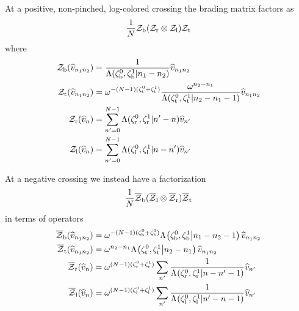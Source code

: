 \documentclass{sl2ams}
\numberwithin{equation}{section}
\begin{document}
\begin{theorem}
  \label{thm:R-factorization}
  At a positive, non-pinched, log-colored crossing the brading matrix factors as
  \begin{equation}
    \label{eq:R-factorization-positive}
    \frac{
      1
    }{
      N
    }
    \mathcal{Z}_{\mathrm{b}} (\mathcal{Z}_{\mathrm{r}} \otimes \mathcal{Z}_{\mathrm{l}}) \mathcal{Z}_{\mathrm{t}}
  \end{equation}
  where
  \begin{align*}
    \mathcal{Z}_{\mathrm{b}}(\widehat{v}_{n_1 n_2})
    &=
    \frac{
      1
    }{
      \Lambda({\zeta^0_{\mathrm{b}} , \zeta^1_{\mathrm{b}}}|{n_1 - n_2})
    }
    \widehat{v}_{n_1 n_2}
    \\
    \mathcal{Z}_{\mathrm{t}}(\widehat{v}_{n_1 n_2})
    &=
      \omega^{-(N-1)(\zeta_{\mathrm{t}}^0 + \zeta_{\mathrm{t}}^1)}
    \frac{
      \omega^{n_2 - n_1} 
    }{
      \Lambda({\zeta^0_{\mathrm{t}}, \zeta^1_{\mathrm{t}}}|{n_2 - n_1 -1})
    }
    \widehat{v}_{n_1 n_2}
    \\
    \mathcal{Z}_{\mathrm{r}}(\widehat{v}_{n})
    &=
    \sum_{n'=0}^{N -1}
    \Lambda({\zeta^0_{\mathrm{r}}, \zeta^1_{\mathrm{r}}}|{n'-n})\widehat{v}_{n'}
    \\
    \mathcal{Z}_{\mathrm{l}}(\widehat{v}_{n})
    &=
    \sum_{n'=0}^{N -1}
    \Lambda({\zeta^0_{\mathrm{l}}, \zeta^1_{\mathrm{l}}}|{n-n'})\widehat{v}_{n'}
  \end{align*}

  At a negative crossing we instead have a factorization
  \begin{equation}
    \label{eq:R-factorization-negative}
    \frac{
      1
    }{
      N
    }
    \overline{\mathcal{Z}}_{\mathrm{b}} (\overline{\mathcal{Z}}_{\mathrm{l}} \otimes \overline{\mathcal{Z}}_{\mathrm{r}}) \overline{\mathcal{Z}}_{\mathrm{t}}
  \end{equation}
  in terms of operators
  \begin{align*}
    \overline{\mathcal{Z}}_{\lE}(\widehat{v}_{n_1 n_2})
    &=
    \omega^{-(N -1)(\zeta_{\lE}^0 + \zeta_{\lE}^1)}
    \qlf{\zeta_{\lE}^0, \zeta_{\lE}^1}{n_1 - n_2 - 1}
    \widehat{v}_{n_1 n_2}
    \\
    \overline{\mathcal{Z}}_{\lW}(\widehat{v}_{n_1 n_2})
    &=
    \omega^{n_2 - n_1}
    \qlf{\zeta_{\lW}^0, \zeta_{\lW}^1}{n_2 - n_1} \widehat{v}_{n_1 n_2}
    \\
    \overline{\mathcal{Z}}_{\lN}(\widehat{v}_n)
    &=
    \omega^{(N -1)(\zeta_{\lN}^0 + \zeta_{\lN}^1)}
    \sum_{n'}
    \frac{
      1
    }{
      \qlf{\zeta_{\lN}^0, \zeta_{\lN}^1}{n - n' - 1}
    }
    \widehat{v}_{n'}
    \\
    \overline{\mathcal{Z}}_{\lS}(\widehat{v}_n)
    &=
    \omega^{(N -1)(\zeta_{\lS}^0 + \zeta_{\lS}^1)}
    \sum_{n'}
    \frac{
      1
    }{
      \qlf{\zeta_{\lS}^0, \zeta_{\lS}^1}{n' - n - 1}
    }
    \widehat{v}_{n'}
  \end{align*}
\end{theorem} 
\end{document}

